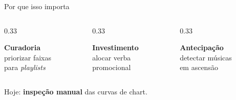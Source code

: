 \documentclass[aspectratio=169]{beamer}
\newcommand{\dest}[1]{\textcolor{ufprB}{\textbf{#1}}}
\newcommand{\azul}[1]{\textcolor{ufprA}{\textbf{#1}}}
\newcommand{\verd}[1]{\textcolor{ufprC}{\textbf{#1}}}
\begin{document}
\begin{frame}{Por que isso importa}
  \vfill
  \begin{columns}[T]
    \begin{column}{0.33\textwidth}
      \begin{center}
      \colorbox{ufprA!12}{\parbox{0.95\textwidth}{\centering\vspace{6pt}\azul{Curadoria}\\[4pt]
      \small priorizar faixas\\ para \emph{playlists}\vspace{6pt}}}
      \end{center}
    \end{column}
    \begin{column}{0.33\textwidth}
      \begin{center}
      \colorbox{ufprC!12}{\parbox{0.95\textwidth}{\centering\vspace{6pt}\verd{Investimento}\\[4pt]
      \small alocar verba\\ promocional\vspace{6pt}}}
      \end{center}
    \end{column}
    \begin{column}{0.33\textwidth}
      \begin{center}
      \colorbox{ufprB!12}{\parbox{0.95\textwidth}{\centering\vspace{6pt}\dest{Antecipação}\\[4pt]
      \small detectar músicas\\ em ascensão\vspace{6pt}}}
      \end{center}
    \end{column}
  \end{columns}
  \vfill
  \begin{center}
  Hoje: \dest{inspeção manual} das curvas de chart.
  \end{center}
  \vfill
\end{frame}
\end{document}
